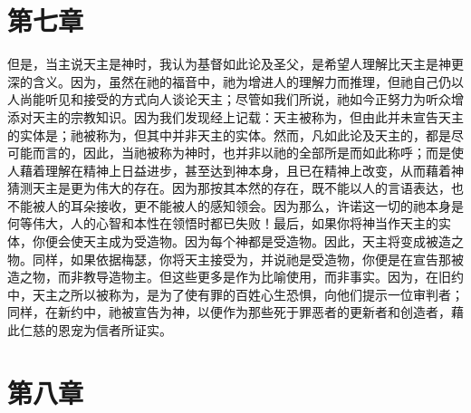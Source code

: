 
\section{第七章}

\par

但是，当主说天主是神时，我认为基督如此论及圣父，是希望人理解比天主是神更深的含义。因为，虽然在祂的福音中，祂为增进人的理解力而推理，但祂自己仍以人尚能听见和接受的方式向人谈论天主；尽管如我们所说，祂如今正努力为听众增添对天主的宗教知识。因为我们发现经上记载：天主被称为，但由此并未宣告天主的实体是；祂被称为，但其中并非天主的实体。然而，凡如此论及天主的，都是尽可能而言的，因此，当祂被称为神时，也并非以祂的全部所是而如此称呼；而是使人藉着理解在精神上日益进步，甚至达到神本身，且已在精神上改变，从而藉着神猜测天主是更为伟大的存在。因为那按其本然的存在，既不能以人的言语表达，也不能被人的耳朵接收，更不能被人的感知领会。因为那么，许诺这一切的祂本身是何等伟大，人的心智和本性在领悟时都已失败！最后，如果你将神当作天主的实体，你便会使天主成为受造物。因为每个神都是受造物。因此，天主将变成被造之物。同样，如果依据梅瑟，你将天主接受为，并说祂是受造物，你便是在宣告那被造之物，而非教导造物主。但这些更多是作为比喻使用，而非事实。因为，在旧约中，天主之所以被称为，是为了使有罪的百姓心生恐惧，向他们提示一位审判者；同样，在新约中，祂被宣告为神，以便作为那些死于罪恶者的更新者和创造者，藉此仁慈的恩宠为信者所证实。\par


\section{第八章}

\par

